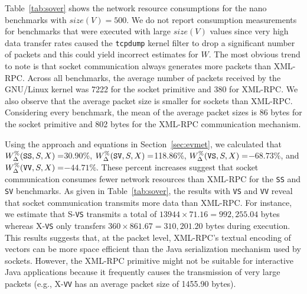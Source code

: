 \documentclass{sig-alternate}
\begin{document}

Table~\ref{tab:sover} shows the network resource consumptions for the
nano benchmarks with $size(V) = 500$.  We do not report consumption
measurements for benchmarks that were executed with large $size(V)$
values since very high data transfer rates caused the {\tt tcpdump}
kernel filter to drop a significant number of packets and this could
yield incorrect estimates for $W$.  The most obvious trend to note is
that socket communication always generates more packets than XML-RPC.
Across all benchmarks, the average number of packets received by the
GNU/Linux kernel was 7222 for the socket primitive and 380 for
XML-RPC. We also observe that the average packet size is smaller for
sockets than XML-RPC.  Considering every benchmark, the mean of the
average packet sizes is 86 bytes for the socket primitive and 802
bytes for the XML-RPC communication mechanism.








Using the approach and equations in Section~\ref{sec:evmet}, we
calculated that {\small $W_\Delta^\%(\mbox{{\tt SS}},S,X)=$}30.90\%,
{\small $W_\Delta^\%({\tt SV},S,X)=$}118.86\%, {\small
  $W_\Delta^\%(\mbox{{\tt VS}},S,X)=$}$-68.73\%$, and {\small
  $W_\Delta^\%(\mbox{{\tt VV}},S,X) =$}$-44.71\%$.  These percent
increases suggest that socket communication consumes fewer network
resources than XML-RPC for the \texttt{SS} and \texttt{SV} benchmarks.
As given in Table~\ref{tab:sover}, the results with \texttt{VS} and
\texttt{VV} reveal that socket communication transmits more data than
XML-RPC.  For instance, we estimate that S-{\tt VS} transmits a total
of $13944 \times 71.16 = 992,255.04$ bytes whereas X-{\tt VS} only
transfers $360 \times 861.67 = 310,201.20$ bytes during execution.
This results suggests that, at the packet level, XML-RPC's textual
encoding of vectors can be more space efficient than the Java
serialization mechanism used by sockets.  However, the XML-RPC
primitive might not be suitable for interactive Java applications
because it frequently causes the transmission of very large packets
(e.g., X-{\tt VV} has an average packet size of 1455.90 bytes).
\end{document}
